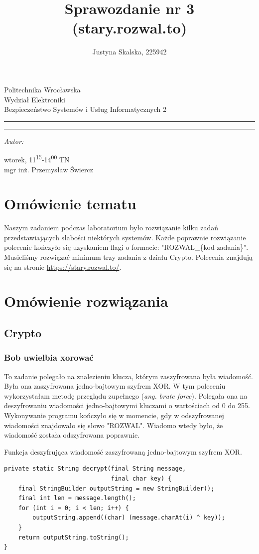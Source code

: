 \documentclass[12pt,a4paper,titlepage]{article}
\author{Justyna Skalska, 225942}
\title{Sprawozdanie nr 3\\
(stary.rozwal.to)}
\makeatletter
\newcommand{\linia}{\rule{\linewidth}{0.4mm}}
\renewcommand{\maketitle}{\begin{titlepage}
    \vspace*{1cm}
    \begin{center}\small
    Politechnika Wrocławska\\
    Wydział Elektroniki\\
    Bezpieczeństwo Systemów i Usług Informatycznych 2
    \end{center}
    \vspace{3cm}
    \noindent\linia
    \begin{center}
      \LARGE \textsc{\@title}
         \end{center}
     \linia
    \vspace{0.5cm}
    \begin{flushright}
    \begin{minipage}{7cm}
    \textit{\small Autor:}\\
    \normalsize \textsc{\@author} \par
    \end{minipage}
    \vspace{5cm}

     {\small wtorek, 11\textsuperscript{15}-14\textsuperscript{00} TN}\\
        mgr inż. Przemysław Świercz
     \end{flushright}
    \vspace*{\stretch{6}}
    \begin{center}
    \@date
    \end{center}
  \end{titlepage}%
}
\makeatother
\begin{document}
\maketitle

\tableofcontents 
\newpage

\section{Omówienie tematu}
Naszym zadaniem podczas laboratorium było rozwiązanie kilku zadań przedstawiających słabości niektórych systemów. Każde poprawnie rozwiązanie polecenie kończyło się uzyskaniem flagi o formacie: "ROZWAL\_\{kod-zadania\}". Musieliśmy rozwiązać minimum trzy zadania z działu Crypto. Polecenia znajdują się na stronie \url{https://stary.rozwal.to/}.

\section{Omówienie rozwiązania}

\subsection{Crypto}
\subsubsection{Bob uwielbia xorować}
To zadanie polegało na znalezieniu klucza, którym zaszyfrowana była wiadomość. Była ona zaszyfrowana jedno-bajtowym szyfrem XOR. W tym poleceniu wykorzystałam metodę przeglądu zupełnego (\textit{ang. brute force}). Polegała ona na deszyfrowaniu wiadomości jedno-bajtowymi kluczami o wartościach od 0 do 255. Wykonywanie programu kończyło się w momencie, gdy w odszyfrowanej wiadomości znajdowało się słowo "ROZWAL". Wiadomo wtedy było, że wiadomość została odszyfrowana poprawnie.

\begin{listing}[H]
\caption{Funkcja deszyfrująca wiadomość zaszyfrowaną jedno-bajtowym szyfrem XOR.}
\begin{verbatim}
private static String decrypt(final String message,
                              final char key) {
    final StringBuilder outputString = new StringBuilder();
    final int len = message.length();
    for (int i = 0; i < len; i++) {
        outputString.append((char) (message.charAt(i) ^ key));
    }
    return outputString.toString();
}
\end{verbatim}
\end{listing}
\end{document}
